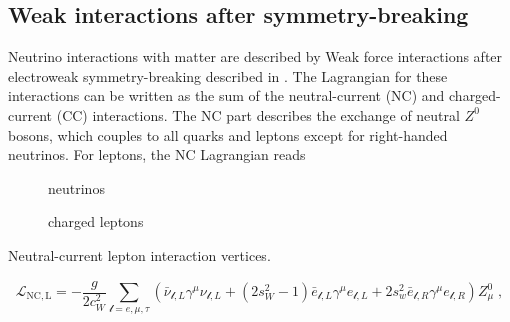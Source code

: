 \subsection{Weak interactions after symmetry-breaking}
Neutrino interactions with matter are described by Weak force interactions after electroweak symmetry-breaking described in .
The Lagrangian for these interactions can be written as the sum of the neutral-current (NC) and charged-current (CC) interactions. The NC part describes the exchange of neutral $Z^0$ bosons, which couples to all quarks and leptons except for right-handed neutrinos. For leptons, the NC Lagrangian reads
\begin{marginfigure}
\centering
\begin{subfigure}[t]{0.49\linewidth}
    \caption{neutrinos}
\end{subfigure}
\begin{subfigure}[t]{0.49\linewidth}
    \caption{charged leptons}
\end{subfigure}
\caption{Neutral-current lepton interaction vertices.}
\label{fig:nc-vertices}
\end{marginfigure}
\begin{equation}
  \mathcal{L}_\mathrm{NC,L} = -\frac{g}{2 c_W^2} \sum_{\mathcal{l}=e,\mu,\tau} (\bar{\nu}_{\mathcal{l}, L} \gamma^\mu \nu_{\mathcal{l}, L} + (2 s_W^2 - 1) \bar{e}_{\mathcal{l}, L} \gamma^\mu e_{\mathcal{l}, L} + 2s_w^2 \bar{e}_{\mathcal{l}, R} \gamma^\mu e_{\mathcal{l}, R}) Z^0_\mu\;, \label{eq:ew-nc-lagrangian}
\end{equation}
